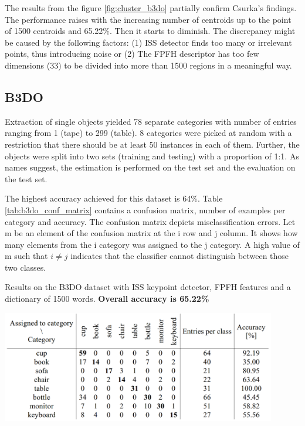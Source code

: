 	The results from the figure \ref{fig:cluster_b3do} partially confirm Csurka's findings. The performance raises with the increasing number of centroids up to the point of 1500 centroids and 65.22\%. Then it starts to diminish. The discrepancy might be caused by the following factors: (1) ISS detector finds too many or irrelevant points, thus introducing noise or (2) The FPFH descriptor has too few dimensions (33) to be divided into more than 1500 regions in a meaningful way. 

	
	\subsection{B3DO}
	Extraction of single objects yielded 78 separate categories with number of entries ranging from 1 (tape) to 299 (table). 8 categories were picked at random with a restriction that there should be at least 50 instances in each of them. Further, the objects were split into two sets (training and testing) with a proportion of 1:1. As names suggest, the estimation is performed on the test set and the evaluation on the test set.
	
	The highest accuracy achieved for this dataset is 64\%. Table \ref{tab:b3do_conf_matrix} contains a confusion matrix, number of examples per category and accuracy. The confusion matrix depicts misclassification errors. Let m be an element of the confusion matrix at the i row and j column. It shows how many elements from the i category was assigned to the j category. A high value of m such that $i \neq j$ indicates that the classifier cannot distinguish between those two classes.
	
	\begin{table}[!ht]
	\centering
	\caption{Results on the B3DO dataset with ISS keypoint detector, FPFH features and a dictionary of 1500 words. \textbf{Overall accuracy is 65.22\%}}
	\includegraphics[width=0.9\textwidth]{figs/b3do_conf_matrix}	
	\label{tab:b3do_conf_matrix}
	\end{table}
	
